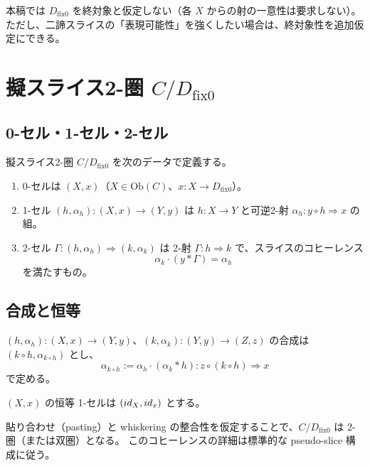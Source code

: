 \documentclass[a4paper,11pt]{article}
\begin{document}
\begin{remark}
本稿では $D_{\mathrm{fix}0}$ を終対象と仮定しない（各 $X$ からの射の一意性は要求しない）。
ただし、二諦スライスの「表現可能性」を強くしたい場合は、終対象性を追加仮定にできる。
\end{remark}

\section{擬スライス2-圏 \texorpdfstring{$C/D_{\mathrm{fix}0}$}{C/Dfix0}}
\subsection{0-セル・1-セル・2-セル}
\begin{definition}[擬スライス2-圏]
擬スライス2-圏 $C/D_{\mathrm{fix}0}$ を次のデータで定義する。
\begin{enumerate}
  \item 0-セルは $(X,x)$（$X\in\mathrm{Ob}(C)$、$x:X\to D_{\mathrm{fix}0}$）。
  \item 1-セル $(h,\alpha_h):(X,x)\to(Y,y)$ は $h:X\to Y$ と可逆2-射 $\alpha_h:y\circ h\Rightarrow x$ の組。
  \item 2-セル $\Gamma:(h,\alpha_h)\Rightarrow(k,\alpha_k)$ は 2-射 $\Gamma:h\Rightarrow k$ で、スライスのコヒーレンス
  \[
    \alpha_k\cdot (y*\Gamma)=\alpha_h
  \]
  を満たすもの。
\end{enumerate}
\end{definition}

\subsection{合成と恒等}
\begin{definition}[1-セルの合成]
$(h,\alpha_h):(X,x)\to(Y,y)$、$(k,\alpha_k):(Y,y)\to(Z,z)$ の合成は
$(k\circ h,\alpha_{k\circ h})$ とし、
\[
  \alpha_{k\circ h}:= \alpha_h\cdot (\alpha_k * h): z\circ(k\circ h)\Rightarrow x
\]
で定める。
\end{definition}

\begin{definition}[恒等1-セル]
$(X,x)$ の恒等 1-セルは $(id_X,id_x)$ とする。
\end{definition}

\begin{remark}
貼り合わせ（pasting）と whiskering の整合性を仮定することで、$C/D_{\mathrm{fix}0}$ は 2-圏（または双圏）となる。
このコヒーレンスの詳細は標準的な pseudo-slice 構成に従う。
\end{remark}
\end{document}
